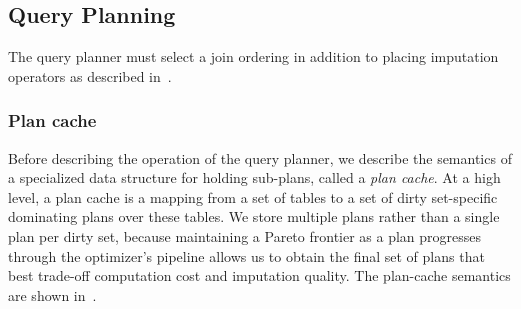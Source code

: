 \subsection{Query Planning}
\label{sec:planning}
The query planner must select a join ordering in addition to placing imputation operators as described in~.

\subsubsection{Plan cache}
Before describing the operation of the query planner, we describe the semantics of a specialized data structure for holding sub-plans, called a \emph{plan cache}.
At a high level, a plan cache is a mapping from a set of tables to a set of dirty set-specific dominating plans over these tables.
We store multiple plans rather than a single plan per dirty set, because maintaining a Pareto frontier as a plan progresses through the optimizer's pipeline
allows us to obtain the final set of plans that best trade-off computation
cost and imputation quality. The plan-cache semantics are shown in~.


\begin{figure}
\end{figure}


